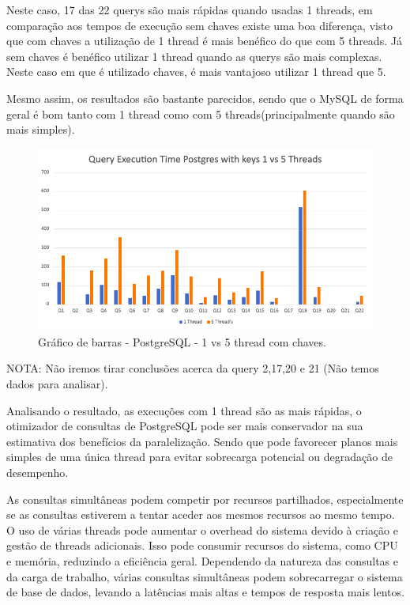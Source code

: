 \documentclass{article}
\begin{document}
  Neste caso, 17 das 22 querys são mais rápidas quando usadas 1 threads, em comparação aos tempos de execução sem chaves existe uma boa diferença, visto que com chaves a utilização de 1 thread é mais benéfico do que com 5 threads. Já sem chaves é benéfico utilizar 1 thread quando as querys são mais complexas. Neste caso em que é utilizado chaves, é mais vantajoso utilizar 1 thread que 5.

  Mesmo assim, os resultados são bastante parecidos, sendo que o MySQL de forma geral é bom tanto com 1 thread como com 5 threads(principalmente quando são mais simples).

  \begin{figure}[H]
    \centering
    \includegraphics[width=\textwidth]{Graphs/postgres_withkeys_1vs5.png}
    \caption{Gráfico de barras - PostgreSQL - 1 vs 5 thread com chaves.} 
    \label{fig:PKCreation2}
  \end{figure}

  NOTA: Não iremos tirar conclusões acerca da query 2,17,20 e 21 (Não temos dados para analisar).

Analisando o resultado, as execuções com 1 thread são as mais rápidas, o otimizador de consultas de PostgreSQL pode ser mais conservador na sua estimativa dos benefícios da paralelização. Sendo que pode favorecer planos mais simples de uma única thread para evitar sobrecarga potencial ou degradação de desempenho.
  
  
  
\quad As consultas simultâneas podem competir por recursos partilhados, especialmente se as consultas estiverem a tentar aceder aos mesmos recursos ao mesmo tempo.
O uso de várias threads pode aumentar o overhead do sistema devido à criação e gestão de threads adicionais. Isso pode consumir recursos do sistema, como CPU e memória, reduzindo a eficiência geral. 
Dependendo da natureza das consultas e da carga de trabalho, várias consultas simultâneas podem sobrecarregar o sistema de base de dados, levando a latências mais altas e tempos de resposta mais lentos. 
 
\end{document}
